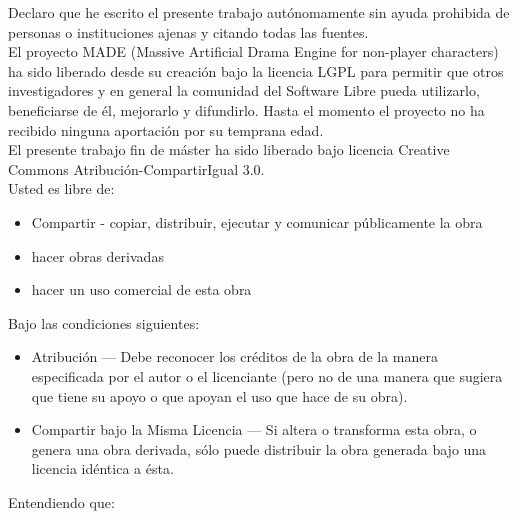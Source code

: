 



\begin{declaration}        %

Declaro que he escrito el presente trabajo autónomamente sin ayuda prohibida de personas o instituciones ajenas y citando todas las fuentes.\\


El proyecto MADE (Massive Artificial Drama Engine for non-player characters) ha sido liberado desde su creación bajo la licencia LGPL para permitir que otros investigadores y en general la comunidad del Software Libre pueda utilizarlo, beneficiarse de él, mejorarlo y difundirlo. Hasta el momento el proyecto no ha recibido ninguna aportación por su temprana edad.\\


El presente trabajo fin de máster ha sido liberado bajo licencia Creative Commons Atribución-CompartirIgual 3.0.\\


Usted es libre de:
\begin{itemize}
\item Compartir - copiar, distribuir, ejecutar y comunicar públicamente la obra
\item hacer obras derivadas
\item hacer un uso comercial de esta obra
\end{itemize}

Bajo las condiciones siguientes:

\begin{itemize}
\item Atribución — Debe reconocer los créditos de la obra de la manera especificada por el autor o el licenciante (pero no de una manera que sugiera que tiene su apoyo o que apoyan el uso que hace de su obra).
\item Compartir bajo la Misma Licencia — Si altera o transforma esta obra, o genera una obra derivada, sólo puede distribuir la obra generada bajo una licencia idéntica a ésta.
\end{itemize}

Entendiendo que:


\end{declaration}
